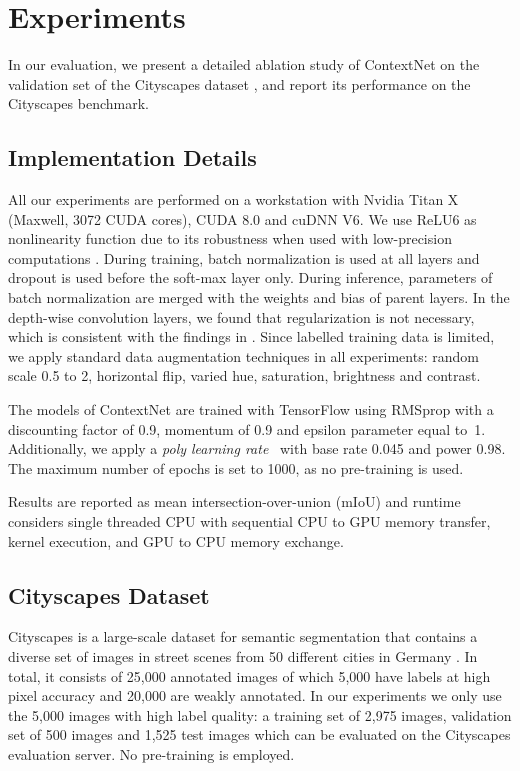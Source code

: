 \documentclass[runningheads]{llncs}
\begin{document}
\section{Experiments}\label{sec:experiments}
In our evaluation, we present a detailed ablation study of ContextNet on the validation set of the Cityscapes dataset \cite{cityscaples2016} , and report its performance on the Cityscapes benchmark.

\subsection{Implementation Details}\label{ssec:implementation-details}
All our experiments are performed on a workstation with Nvidia Titan X (Maxwell, 3072 CUDA cores), CUDA 8.0 and cuDNN V6. We use ReLU6 as nonlinearity function due to its robustness when used with low-precision computations \cite{howard2017}. During training, batch normalization is used at all layers and dropout is used before the soft-max layer only. During inference, parameters of batch normalization are merged with the weights and bias of parent layers. In the depth-wise convolution layers, we found that  regularization is not necessary, which is consistent with the findings in \cite{howard2017}. Since labelled training data is limited, we apply standard data augmentation techniques in all experiments: random scale 0.5 to 2, horizontal flip, varied hue, saturation, brightness and contrast.

The models of ContextNet are trained with TensorFlow \cite{tensorflow2015} using RMSprop \cite{tieleman2012} with a discounting factor of 0.9, momentum of 0.9 and epsilon parameter equal to~1. Additionally, we apply a \textit{poly learning rate}~\cite{chen2016} with base rate 0.045 and power 0.98. The maximum number of epochs is set to 1000, as no pre-training is used.

Results are reported as mean intersection-over-union (mIoU) \cite{cityscaples2016} and runtime considers single threaded CPU with sequential CPU to GPU memory transfer, kernel execution, and GPU to CPU memory exchange.

\subsection{Cityscapes Dataset}
Cityscapes is a large-scale dataset for semantic segmentation that contains a diverse set of images in street scenes from 50 different cities in Germany \cite{cityscaples2016}. In total, it consists of 25,000 annotated  images of which 5,000 have labels at high pixel accuracy and 20,000 are weakly annotated. In our experiments we only use the 5,000 images with high label quality: a training set of 2,975 images, validation set of 500 images and 1,525 test images which can be evaluated on the Cityscapes evaluation server. No pre-training is employed.
\end{document}
